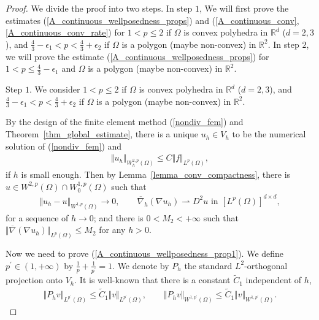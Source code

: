 \documentclass[12pt]{amsart}
\theoremstyle{definition}
\theoremstyle{remark}
\begin{document}
\begin{proof}
We divide the proof into two steps. In step $1$,
We will first prove the estimates (\ref{A_continuous_wellposedness_props}) 
and (\ref{A_continuous_conv},\ref{A_continuous_conv_rate}) for 
 $1< p \leq 2$ if $\Omega$ is convex polyhedra in $\mathbb{R}^{d}$ ($d=2,3$), and 
 $ \frac{4}{3} - \epsilon_{1} <p < \frac{4}{3} 
+ \epsilon_{2}$ if $\Omega$ is a polygon (maybe non-convex) in $\mathbb{R}^{2}$. 
In step $2$, we will prove the estimate (\ref{A_continuous_wellposedness_props}) 
for $1< p \leq \frac{4}{3} - \epsilon_{1}$ and $\Omega$ is a 
polygon (maybe non-convex) in $\mathbb{R}^{2}$. 

Step $1$. We consider $1< p \leq 2$ if $\Omega$ is convex polyhedra in $\mathbb{R}^{d}$ ($d=2,3$), and $ \frac{4}{3} - \epsilon_{1} <p < \frac{4}{3} 
+ \epsilon_{2}$ if $\Omega$ is a polygon (maybe non-convex) in $\mathbb{R}^{2}$.

By the design of the finite element method (\ref{nondiv_fem}) and 
Theorem~\ref{thm_global_estimate}, there is a unique $u_{h} \in V_{h}$ 
to be the numerical solution of (\ref{nondiv_fem}) and 
\begin{align*}
\Vert u_{h} \Vert_{W_{h}^{2,p}(\Omega)} \leq C \Vert f\Vert_{L^{p}(\Omega)},
\end{align*}
if $h$ is small enough. Then by Lemma~\ref{lemma_conv_compactness}, there is 
$u \in W^{2,p}(\Omega) \cap W_{0}^{1,p}(\Omega)$ such that 
\begin{align*}
\Vert u_{h} - u\Vert_{W^{1,p}(\Omega)} \rightarrow 0, \qquad 
\overline{\nabla}_{h}(\nabla u_{h}) \rightharpoonup D^{2}u 
\text{ in } [L^{p}(\Omega)]^{d \times d},
\end{align*}
for a sequence of $h \rightarrow 0$; and there is $0 < M_{2} < +\infty$ such that 
$\Vert \overline{\nabla}(\nabla u_{h})\Vert_{L^{p}(\Omega)} \leq M_{2}$ for any 
$h > 0$.

Now we need to prove (\ref{A_continuous_wellposedness_prop1}). 
We define $p^{\prime} \in (1, + \infty)$ by  $\frac{1}{p} + \frac{1}{p^{\prime}} = 1$. 
We denote by $P_{h}$ the standard $L^{2}$-orthogonal projection onto $V_{h}$.
It is well-known that there is a constant $\tilde{C}_{1}$ independent of $h$, 
\begin{align}
\label{L2_projection_bound3}
\Vert P_{h} v\Vert_{L^{p^{\prime}}(\Omega)} \leq \tilde{C}_{1} \Vert v\Vert_{L^{p^{\prime}}(\Omega)}, 
\qquad \Vert P_{h} v\Vert_{W^{1,p^{\prime}}(\Omega)} \leq \tilde{C}_{1} \Vert v\Vert_{W^{1,p^{\prime}}(\Omega)}.
\end{align}


\end{proof}
\end{document}
